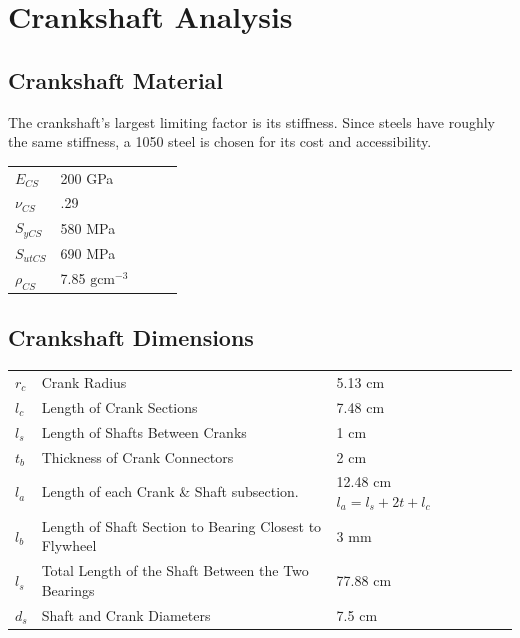 \documentclass[10pt,a4paper]{article}
\begin{document}
\section*{Crankshaft Analysis}
\subsection*{Crankshaft Material}
The crankshaft's largest limiting factor is its stiffness. Since steels have roughly the same stiffness, a 1050 steel is chosen for its cost and accessibility.
\begin{table}[H]
\begin{tabular}{lllll}
$E_{CS}$ & 200 GPa  \\
 $\nu_{CS}$&  .29   \\
 $S_{y CS}$&  580 MPa  \\
 $S_{ut CS}$&  690 MPa  \\
 $\rho_{CS}$& 7.85 $\text{g}\text{cm}^{-3}$  
\end{tabular}
\end{table}
\subsection*{Crankshaft Dimensions}
\begin{table}[H]
\begin{tabular}{lllll}
$r_c$ & Crank Radius & 5.13 cm  \\
 $l_c$& Length of Crank Sections & 7.48 cm   \\
 $l_s$& Length of Shafts Between Cranks & 1 cm   \\
 $t_b$& Thickness of Crank Connectors & 2 cm   \\
 $l_a$& Length of each Crank \& Shaft subsection. & 12.48 cm $l_a = l_s + 2t + l_c$  \\
 $l_b$& Length of Shaft Section to Bearing Closest to Flywheel &  3 mm  \\
$l_s$ & Total Length of the Shaft Between the Two Bearings &  77.88 cm  \\
$d_s$& Shaft and Crank Diameters & 7.5 cm
\end{tabular}
\end{table}
\end{document}
